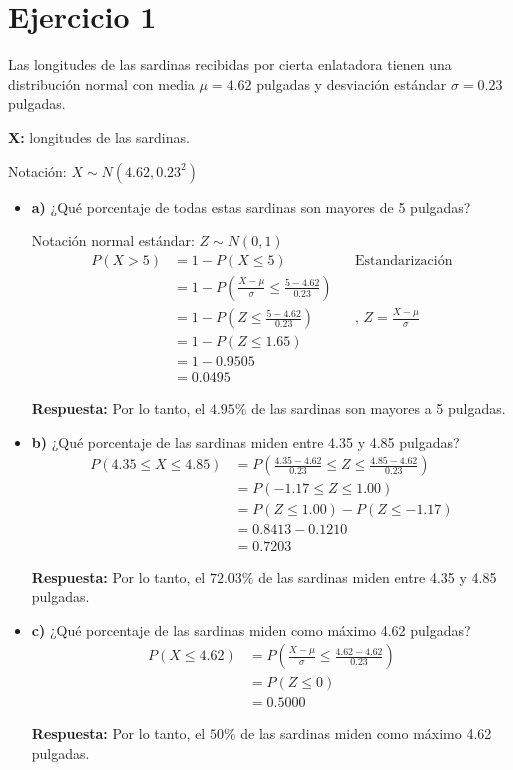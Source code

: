 \documentclass{templateNote}
\begin{document}
\portada
\margenes %

\section*{Ejercicio 1}
Las longitudes de las sardinas recibidas por cierta enlatadora tienen una distribución normal con media  $\mu = 4.62$ pulgadas y desviación estándar $\sigma = 0.23$ pulgadas.

\textbf{X:} longitudes de las sardinas.

Notación: $X \sim N(4.62, 0.23^2)$
\begin{itemize}
  \item \textbf{a)} ¿Qué porcentaje de todas estas sardinas son mayores de 5 pulgadas?
  
  Notación normal estándar: $Z \sim N(0, 1)$
  \begin{align*}
    P(X > 5) &= 1 - P(X \leq 5) && \text{Estandarización}\\
    &= 1 - P\left(\frac{X - \mu}{\sigma} \leq \frac{5 - 4.62}{0.23}\right) \\
    &= 1 - P\left(Z \leq \frac{5 - 4.62}{0.23}\right) && \text{, } Z = \frac{X - \mu}{\sigma} \\
    &= 1 - P(Z \leq 1.65) \\
    &= 1 - 0.9505 \\
    &= 0.0495
  \end{align*}
  
  \textbf{Respuesta:} Por lo tanto, el $4.95\%$ de las sardinas son mayores a 5 pulgadas.

  \item \textbf{b)} ¿Qué porcentaje de las sardinas miden entre 4.35 y 4.85 pulgadas?
  \begin{align*}
    P(4.35 \leq X \leq 4.85) &= P\left(\frac{4.35 - 4.62}{0.23} \leq Z \leq \frac{4.85 - 4.62}{0.23}\right) \\
    &= P(-1.17 \leq Z \leq 1.00) \\
    &= P(Z \leq 1.00) - P(Z \leq -1.17) \\
    &= 0.8413 - 0.1210 \\
    &= 0.7203
  \end{align*}

  \textbf{Respuesta:} Por lo tanto, el $72.03\%$ de las sardinas miden entre 4.35 y 4.85 pulgadas.
  
  \item \textbf{c)} ¿Qué porcentaje de las sardinas miden como máximo 4.62 pulgadas?
  \begin{align*}
    P(X \leq 4.62) &= P\left(\frac{X - \mu}{\sigma} \leq \frac{4.62 - 4.62}{0.23}\right) \\
    &= P(Z \leq 0) \\
    &= 0.5000
  \end{align*}

  \textbf{Respuesta:} Por lo tanto, el $50\%$ de las sardinas miden como máximo 4.62 pulgadas.
\end{itemize}
\end{document}
